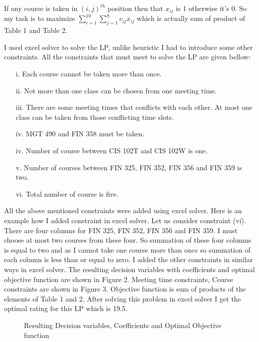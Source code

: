 \documentclass[paper=letter, fontsize=11pt]{scrartcl} %
\begin{document}
If any course is taken in $(i,j)^{th}$ position then that  $x_{ij}$ is 1 otherwise it's 0. So my task is to maximize 
$\displaystyle\sum_{i=1}^{10}\sum_{j=1}^{8} c_{ij}x_{ij}$ which is actually sum of product of Table 1 and Table 2.

I used excel solver to solve the LP, unlike heuristic I had to introduce some other constraints. All the constraints that must meet to solve the LP are given bellow:

\begin{enumerate}[align=left,style=nextline,leftmargin=1.5cm,labelsep=\parindent,font=\normalfont]
\item[i.]  Each course cannot be taken more than once.
\item[ii.] Not more than one class can be chosen from one meeting time.
\item[iii.] There are some meeting times that conflicts with each other. At most one class can be taken from those conflicting time slots.  
\item[iv.] MGT 490 and FIN 358 must be taken.
\item[iv.] Number of course between CIS 102T and CIS 102W is one.
\item[v.] Number of courses between FIN 325, FIN 352, FIN 356 and FIN 359 is two.
\item[vi.] Total number of course is five.
\end{enumerate}  

All the above mentioned constraints were added using excel solver. Here is an example how I added constraint in excel solver. Let us consider constraint (vi). There are four columns for FIN 325, FIN 352, FIN 356 and FIN 359. I must choose at most two courses from these four. So summation of these four columns is equal to two and as I cannot take one course more than once so summation of each column is less than or equal to zero. I added the other constraints in similar ways in excel solver.  The resulting decision variables with coefficients and optimal objective function are shown in Figure 2. Meeting time constraints, Course constraints are shown in Figure 3. Objective function is sum of products of the elements of Table 1 and 2. After solving this problem in excel solver I get the optimal rating for this LP which is 19.5.         
\begin{figure}[H]
  
  \centering
    \caption{Resulting Decision variables, Coefficients and Optimal Objective function}
\end{figure}
\end{document}
